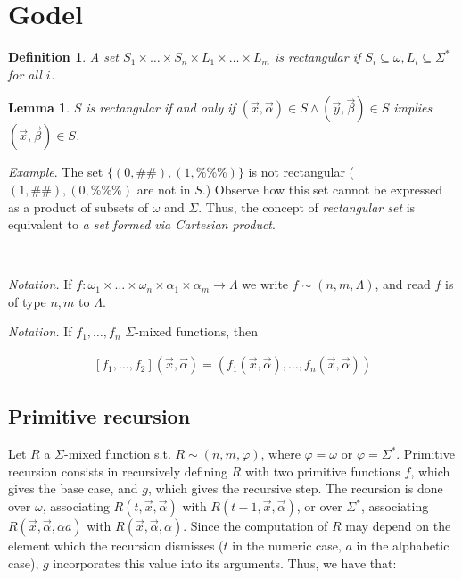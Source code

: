 \documentclass[a4paper, 12pt]{article}
\newtheorem{lemma}{Lemma}
\newtheorem{definition}{Definition}
\newtheorem{lemma}{Lemma}
\begin{document}
\pagebreak
\section{Godel}

\begin{definition}
    A set $S_1\times  \ldots  \times  S_n \times L_1 \times  \ldots \times  L_m$ is
    rectangular if $S_i \subseteq \omega, L_i \subseteq \Sigma^{*}$ for all $i$.
\end{definition}

\begin{lemma}
    $S$ is rectangular if and only if $(\overrightarrow{x},
    \overrightarrow{\alpha}) \in S \land (\overrightarrow{y},
    \overrightarrow{\beta}) \in S$ implies $(\overrightarrow{x},
    \overrightarrow{\beta}) \in S$.
\end{lemma}

\textit{Example}. The set $\{(0, \#\#), (1, \%\%\%)\}$ is not rectangular ($(1,
\#\#), (0, \%\%\%)$ are not in $S$.) Observe how this set cannot be expressed as
a product of subsets of $\omega$ and $\Sigma$. Thus, the concept of
\textit{rectangular set} is equivalent to \textit{a set formed via Cartesian
product}.

~

\textit{Notation.} If $f : \omega_1 \times \ldots \times \omega_n \times
\alpha_1 \times \alpha_m \to \Lambda$ we write $f \sim (n, m, \Lambda)$, and
read $f$ is of type $n, m$ to $\Lambda$.

\textit{Notation.} If $f_1, \ldots, f_n$ $\Sigma$-mixed functions, then 

\begin{align*}
    \left[ f_1, \ldots, f_2 \right](\overrightarrow{x}, \overrightarrow{\alpha})
    = \left( f_1(\overrightarrow{x}, \overrightarrow{\alpha}), \ldots,
    f_n(\overrightarrow{x}, \overrightarrow{\alpha}) \right) 
\end{align*}


\subsection{Primitive recursion} 

Let $R$ a $\Sigma$-mixed function s.t. $R \sim (n, m, \varphi)$, where $\varphi
= \omega$ or $\varphi = \Sigma^{*}$. Primitive recursion consists in recursively
defining $R$ with two primitive functions $f$, which gives the base case, and
$g$, which gives the recursive step. The recursion is done over $\omega$,
associating $R(t, \vec{x}, \vec{\alpha})$ with $R(t - 1, \vec{x},
\vec{\alpha})$, or over $\Sigma^{*}$, associating $R(\vec{x}, \vec{\alpha},
\alpha a)$ with $R(\vec{x}, \vec{\alpha}, \alpha)$. Since the computation of $R$
may depend on the element which the
recursion dismisses ($t$ in the numeric case, $a$ in the alphabetic case), $g$
incorporates this value into its arguments. Thus, we have that: 
\end{document}
